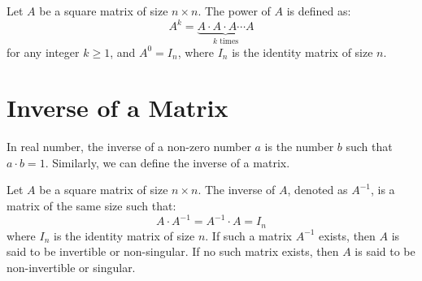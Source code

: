 \begin{definition}
    Let $A$ be a square matrix of size $n \times n$. The power of $A$ is defined as:
    \[
        A^k = \underbrace{A \cdot A \cdot A \cdots A}_{k \text{ times}}
    \]
    for any integer $k \geq 1$, and $A^0 = I_n$, where $I_n$ is the identity matrix of size $n$.
\end{definition}

\section{Inverse of a Matrix}
In real number, the inverse of a non-zero number $a$ is the number $b$ such that $a \cdot b = 1$. Similarly, we can define the inverse of a matrix.
\begin{definition}
    Let $A$ be a square matrix of size $n \times n$. The inverse of $A$, denoted as $A^{-1}$, is a matrix of the same size such that:
    \[
        A \cdot A^{-1} = A^{-1} \cdot A = I_n
    \]
    where $I_n$ is the identity matrix of size $n$. If such a matrix $A^{-1}$ exists, then $A$ is said to be invertible or non-singular. If no such matrix exists, then $A$ is said to be non-invertible or singular.
\end{definition}

